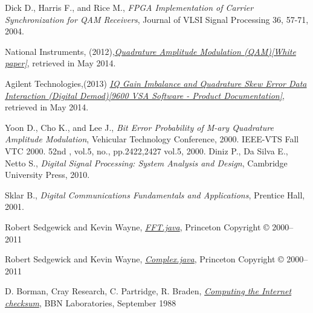 \documentclass[12pt,a4paper,openright]{report}
\begin{document}
\begin{thebibliography}{1}
Dick D., Harris F., and Rice M., \emph{FPGA Implementation of Carrier Synchronization for QAM Receivers}, Journal of VLSI Signal Processing 36, 57-71, 2004.

National Instruments, (2012),\href{http://www.ni.com/white-paper/3896/en/}{\emph{Quadrature Amplitude Modulation (QAM)[White paper]}}, retrieved in May 2014.

Agilent Technologies,(2013) \href{http://wireless.agilent.com/wireless/helpfiles/89600B/WebHelp/subsystems/digdemod/content/digdemod_para_interact_iqgainimb_quadskewerr.htm}{\emph{IQ Gain Imbalance and Quadrature Skew Error Data Interaction (Digital Demod)[9600 VSA Software - Product Documentation]}}, retrieved in May 2014.

Yoon D., Cho K., and Lee J., \emph{Bit Error Probability of M-ary Quadrature Amplitude Modulation}, Vehicular Technology Conference, 2000. IEEE-VTS Fall VTC 2000. 52nd , vol.5, no., pp.2422,2427 vol.5, 2000.
Diniz P., Da Silva E., Netto S., \emph{Digital Signal Processing: System Analysis and Design}, Cambridge University Press, 2010.

Sklar B., \emph{Digital Communications Fundamentals and Applications}, Prentice Hall, 2001.


Robert Sedgewick and Kevin Wayne,
\href{http://introcs.cs.princeton.edu/java/97data/FFT.java.html}{\emph{FFT.java}},  Princeton
Copyright © 2000–2011

Robert Sedgewick and Kevin Wayne,
\href{http://introcs.cs.princeton.edu/java/97data/Complex.java.html}{\emph{Complex.java}},  Princeton
Copyright © 2000–2011

D.  Borman, 
Cray Research, 
C. Partridge, 
R.  Braden, 
\href{http://introcs.cs.princeton.edu/java/97data/Complex.java.html}{\emph{Computing the Internet checksum}}, BBN Laboratories, 
September 1988








\end{thebibliography}
\end{document}
